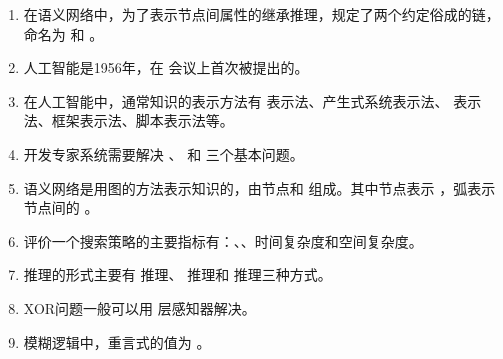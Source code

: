 \begin{enumerate}[leftmargin=2em,itemsep=1pt]
\item 在语义网络中，为了表示节点间属性的继承推理，规定了两个约定俗成的链，命名为 \underline{\hspace{4em}} 和 \underline{\hspace{4em}}。
\item 人工智能是1956年，在 \underline{\hspace{4em}} 会议上首次被提出的。
\item 在人工智能中，通常知识的表示方法有 \underline{\hspace{4em}} 表示法、产生式系统表示法、\underline{\hspace{4em}} 表示法、框架表示法、脚本表示法等。
\item 开发专家系统需要解决 \underline{\hspace{4em}}、\underline{\hspace{4em}} 和 \underline{\hspace{4em}} 三个基本问题。
\item 语义网络是用图的方法表示知识的，由节点和 \underline{\hspace{4em}} 组成。其中节点表示 \underline{\hspace{4em}}，弧表示节点间的 \underline{\hspace{4em}}。
\item 评价一个搜索策略的主要指标有：\underline{\hspace{4em}}、\underline{\hspace{4em}}、时间复杂度和空间复杂度。
\item 推理的形式主要有 \underline{\hspace{4em}} 推理、\underline{\hspace{4em}} 推理和 \underline{\hspace{4em}} 推理三种方式。
\item XOR问题一般可以用 \underline{\hspace{4em}} 层感知器解决。
\item 模糊逻辑中，重言式的值为 \underline{\hspace{4em}}。
\end{enumerate}

